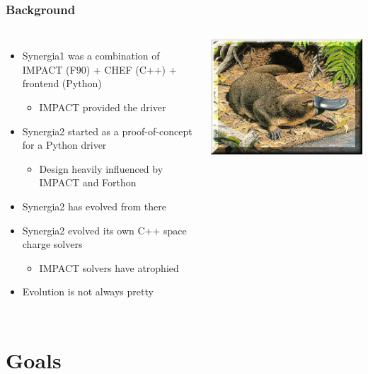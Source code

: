 \documentclass{beamer}
\begin{document}
\begin{frame}
 \frametitle{Background}
  

\begin{columns}
\begin{itemize}
  \item Synergia1 was a combination of IMPACT (F90) + CHEF (C++) + frontend (Python)
\begin{itemize}
  \item IMPACT provided the driver
\end{itemize}
  \item Synergia2 started as a proof-of-concept for a Python driver
\begin{itemize}
  \item Design heavily influenced by IMPACT and Forthon
\end{itemize}
  \item Synergia2 has evolved from there
  \item Synergia2 evolved its own C++ space charge solvers
\begin{itemize}
  \item IMPACT solvers have atrophied
\end{itemize}
  \item Evolution is not always pretty
\end{itemize}
\includegraphics[width=\textwidth]{Platypus.jpg}
\end{columns}

  
 \end{frame}

\section{Goals}
\end{document}
